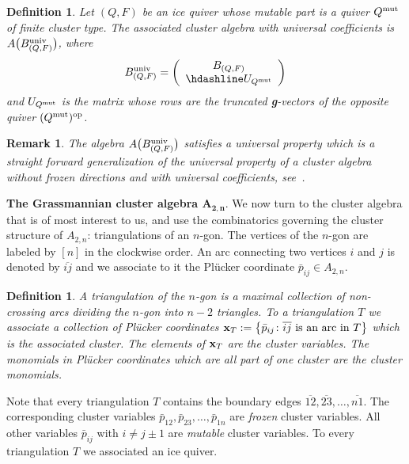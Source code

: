 \documentclass[pdftex]{sigma}%
\newtheorem{Definition}[Theorem]{Definition}
\newtheorem{Remark}[Theorem]{Remark}}
\numberwithin{equation}{section}
\begin{document}
\begin{Definition}
Let $(Q,F)$ be an ice quiver whose mutable part is a quiver $Q^{\rm mut}$ of finite cluster type. The {\it associated cluster algebra with universal coefficients} is $A\big(B_{(Q,F)}^{{\rm univ}}\big)$, where
\begin{displaymath}
B^{{\rm univ}}_{(Q,F)}=
\left(
\begin{array}{c}
 B_{(Q,F)} \\ \hdashline
 U_{Q^{\rm mut}}
\end{array}
\right)
\end{displaymath}
and $U_{Q^{\rm mut}}$ is the matrix whose rows are the truncated {\bf g}-vectors of the opposite quiver $(Q^{\rm mut})^{\rm op}$.
\end{Definition}

\begin{Remark}
The algebra $A\big(B_{(Q,F)}^{{\rm univ}}\big)$ satisfies a universal property which is a straight forward generalization of the universal property of a cluster algebra without frozen directions and with universal coefficients, see~.
\end{Remark}


\noindent
{\bf The Grassmannian cluster algebra $\boldsymbol{A_{2,n}}$}. We now turn to the cluster algebra that is of most interest to us, and use the combinatorics governing the cluster structure of $A_{2,n}$: triangulations of an $n$-gon. The vertices of the $n$-gon are labeled by $[n]$ in the clockwise order.
An arc connecting two vertices $i$ and $j$ is denoted by $\overline{ij}$ and we associate to it the Pl\"ucker coordinate $\bar p_{ij}\in A_{2,n}$.

\begin{Definition}
A {\it triangulation} of the $n$-gon is a maximal collection of non-crossing arcs dividing the $n$-gon into $n-2$ triangles.
To a triangulation $T$ we associate a collection of Pl\"ucker coordinates ${\bf x}_T:=\big\{\bar p_{ij} \colon \overline{ij} \text{ is an arc in }T\big\}$ which is the associated {\it cluster}.
The elements of ${\bf x}_T$ are the {\it cluster variables}.
The monomials in Pl\"ucker coordinates which are all part of one cluster are the {\it cluster monomials}.
\end{Definition}

Note that every triangulation $T$ contains the boundary edges $\overline{12},\overline{23},\dots,\overline{n1}$.
The correspon\-ding cluster variables $\bar p_{12},\bar p_{23},\dots,\bar p_{1n}$ are {\it frozen} cluster variables.
All other variables $\bar p_{ij}$ with $i\not=j\pm 1$ are {\it mutable} cluster variables.
To every triangulation $T$ we associated an ice quiver.
\end{document}
